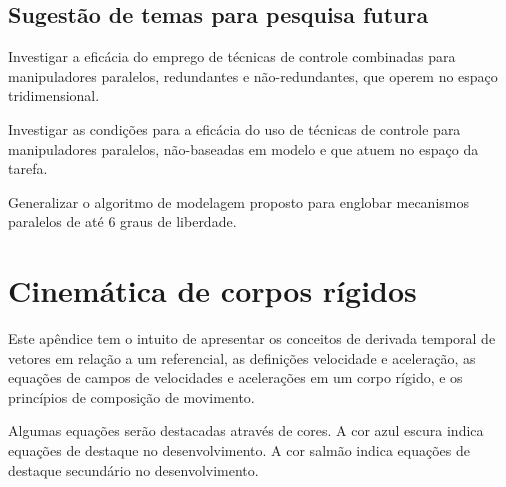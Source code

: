 \documentclass[]{politex}
\begin{document}
\section{Sugestão de temas para pesquisa futura}

Investigar a eficácia do emprego de técnicas de controle combinadas para manipuladores paralelos, redundantes e não-redundantes, que operem no espaço tridimensional.

\vspace{0.3cm}

Investigar as condições para a eficácia do uso de técnicas de controle para manipuladores paralelos, não-baseadas em modelo e que atuem no espaço da tarefa.

\vspace{0.3cm}

Generalizar o algoritmo de modelagem proposto para englobar mecanismos paralelos de até 6 graus de liberdade.




%






\apendice

\chapter{Cinemática de corpos rígidos} \label{ap:CinCorposRig}

Este apêndice tem o intuito de apresentar os conceitos de derivada temporal de vetores em relação a um referencial, as definições velocidade e aceleração, as equações de campos de velocidades e acelerações em um corpo rígido, e os princípios de composição de movimento.

Algumas equações serão destacadas através de cores. A cor azul escura indica equações de destaque no desenvolvimento. A cor salmão indica equações de destaque secundário no desenvolvimento.
\end{document}

